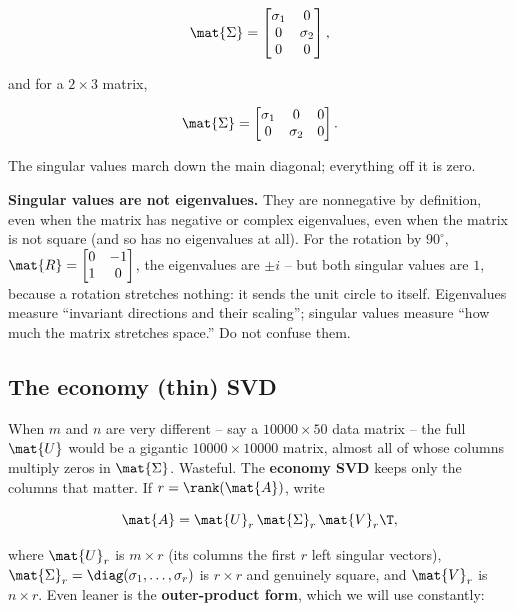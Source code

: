 \[
  \mat{\Sigma} = \begin{bmatrix} \sigma_1 & 0 \\ 0 & \sigma_2 \\ 0 & 0 \end{bmatrix},
\]

and for a $2 \times 3$ matrix,

\[
  \mat{\Sigma} = \begin{bmatrix} \sigma_1 & 0 & 0 \\ 0 & \sigma_2 & 0 \end{bmatrix}.
\]

The singular values march down the main diagonal; everything off it is zero.

\begin{trapbox}
\textbf{Singular values are not eigenvalues.} They are nonnegative by
definition, even when the matrix has negative or complex eigenvalues, even when
the matrix is not square (and so has no eigenvalues at all). For the rotation by
$90^\circ$, $\mat{R} = \begin{bmatrix} 0 & -1 \\ 1 & 0\end{bmatrix}$, the
eigenvalues are $\pm i$ -- but both singular values are $1$, because a rotation
stretches nothing: it sends the unit circle to itself. Eigenvalues measure
``invariant directions and their scaling''; singular values measure ``how much
the matrix stretches space.'' Do not confuse them.
\end{trapbox}

\subsection{The economy (thin) SVD}

When $m$ and $n$ are very different -- say a $10000 \times 50$ data matrix -- the
full $\mat{U}$ would be a gigantic $10000 \times 10000$ matrix, almost all of
whose columns multiply zeros in $\mat{\Sigma}$. Wasteful. The \textbf{economy
SVD} keeps only the columns that matter. If $r = \rank(\mat{A})$, write

\[
  \mat{A} = \mat{U}_r\,\mat{\Sigma}_r\,\mat{V}_r\T,
\]

where $\mat{U}_r$ is $m \times r$ (its columns the first $r$ left singular
vectors), $\mat{\Sigma}_r = \diag(\sigma_1,\dots,\sigma_r)$ is $r \times r$ and
genuinely square, and $\mat{V}_r$ is $n \times r$. Even leaner is the
\textbf{outer-product form}, which we will use constantly:

